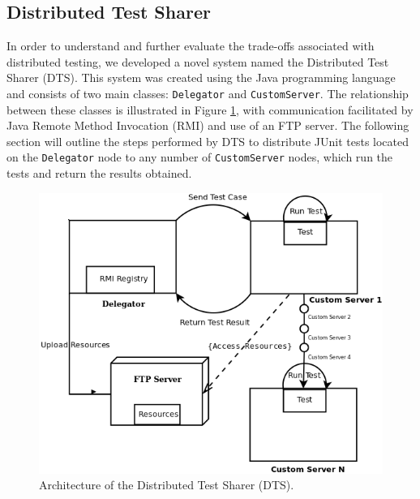 \documentclass{article}
\begin{document}
{\subsection{Distributed Test Sharer}
\label{sharer}
In order to understand and further evaluate the trade-offs associated with distributed testing, we developed a novel system named the Distributed Test Sharer (DTS).  This system was created using the Java programming language and consists of two main classes: \texttt{Delegator} and \texttt{CustomServer}.  The relationship between these classes is illustrated in Figure \ref{dtsdiagram}, with communication facilitated by Java Remote Method Invocation (RMI) and use of an FTP server.  The following section will outline the steps performed by DTS to distribute JUnit tests located on the \texttt{Delegator} node to any number of \texttt{CustomServer} nodes, which run the tests and return the results obtained.

\begin{figure}[H]
\includegraphics[width = \textwidth]{DTS_Diagram.png}
\caption{Architecture of the Distributed Test Sharer (DTS).}
\label{dtsdiagram}
\end{figure}

}
\end{document}
